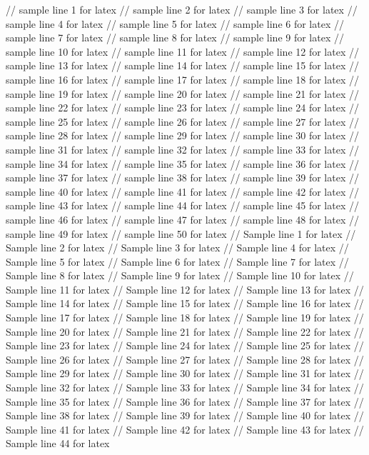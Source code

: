 // sample line 1 for latex
// sample line 2 for latex
// sample line 3 for latex
// sample line 4 for latex
// sample line 5 for latex
// sample line 6 for latex
// sample line 7 for latex
// sample line 8 for latex
// sample line 9 for latex
// sample line 10 for latex
// sample line 11 for latex
// sample line 12 for latex
// sample line 13 for latex
// sample line 14 for latex
// sample line 15 for latex
// sample line 16 for latex
// sample line 17 for latex
// sample line 18 for latex
// sample line 19 for latex
// sample line 20 for latex
// sample line 21 for latex
// sample line 22 for latex
// sample line 23 for latex
// sample line 24 for latex
// sample line 25 for latex
// sample line 26 for latex
// sample line 27 for latex
// sample line 28 for latex
// sample line 29 for latex
// sample line 30 for latex
// sample line 31 for latex
// sample line 32 for latex
// sample line 33 for latex
// sample line 34 for latex
// sample line 35 for latex
// sample line 36 for latex
// sample line 37 for latex
// sample line 38 for latex
// sample line 39 for latex
// sample line 40 for latex
// sample line 41 for latex
// sample line 42 for latex
// sample line 43 for latex
// sample line 44 for latex
// sample line 45 for latex
// sample line 46 for latex
// sample line 47 for latex
// sample line 48 for latex
// sample line 49 for latex
// sample line 50 for latex
// Sample line 1 for latex
// Sample line 2 for latex
// Sample line 3 for latex
// Sample line 4 for latex
// Sample line 5 for latex
// Sample line 6 for latex
// Sample line 7 for latex
// Sample line 8 for latex
// Sample line 9 for latex
// Sample line 10 for latex
// Sample line 11 for latex
// Sample line 12 for latex
// Sample line 13 for latex
// Sample line 14 for latex
// Sample line 15 for latex
// Sample line 16 for latex
// Sample line 17 for latex
// Sample line 18 for latex
// Sample line 19 for latex
// Sample line 20 for latex
// Sample line 21 for latex
// Sample line 22 for latex
// Sample line 23 for latex
// Sample line 24 for latex
// Sample line 25 for latex
// Sample line 26 for latex
// Sample line 27 for latex
// Sample line 28 for latex
// Sample line 29 for latex
// Sample line 30 for latex
// Sample line 31 for latex
// Sample line 32 for latex
// Sample line 33 for latex
// Sample line 34 for latex
// Sample line 35 for latex
// Sample line 36 for latex
// Sample line 37 for latex
// Sample line 38 for latex
// Sample line 39 for latex
// Sample line 40 for latex
// Sample line 41 for latex
// Sample line 42 for latex
// Sample line 43 for latex
// Sample line 44 for latex
